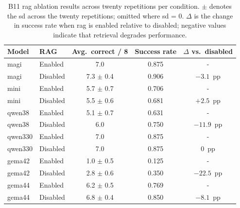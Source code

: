 \begin{table}[t]
	\centering
	\begin{tabular}{llccc}
		\hline
		\textbf{Model}        & \textbf{RAG}                    & \textbf{Avg.\ correct / 8} &
		\textbf{Success rate} & \textbf{$\Delta$ vs.\ disabled}                                                   \\
		\hline
		\gls{magi}            & Enabled                         & 7.0                        & 0.875 & -          \\
		\gls{magi}            & Disabled                        & 7.3 $\pm$ 0.4              & 0.906 & $-3.1$~pp  \\
		\hline
		\gls{mini}            & Enabled                         & 5.7 $\pm$ 0.7              & 0.706 & -          \\
		\gls{mini}            & Disabled                        & 5.5 $\pm$ 0.6              & 0.681 & $+2.5$~pp  \\
		\hline
		\gls{qwen38}          & Enabled                         & 5.1 $\pm$ 0.7              & 0.631 & -          \\
		\gls{qwen38}          & Disabled                        & 6.0                        & 0.750 & $-11.9$~pp \\
		\hline
		\gls{qwen330}         & Enabled                         & 7.0                        & 0.875 & -          \\
		\gls{qwen330}         & Disabled                        & 7.0                        & 0.875 & $0$~pp     \\
		\hline
		\gls{gema42}          & Enabled                         & 1.0 $\pm$ 0.5              & 0.125 & -          \\
		\gls{gema42}          & Disabled                        & 2.8 $\pm$ 0.6              & 0.350 & $-22.5$~pp \\
		\hline
		\gls{gema44}          & Enabled                         & 6.2 $\pm$ 0.5              & 0.769 & -          \\
		\gls{gema44}          & Disabled                        & 6.8 $\pm$ 0.4              & 0.850 & $-8.1$~pp  \\
		\hline
	\end{tabular}
	\caption{B11 \gls{rag} ablation results across twenty repetitions per condition. $\pm$ denotes the \gls{sd} across the twenty repetitions; omitted where \gls{sd} = 0. $\Delta$ is the change in success rate when \gls{rag} is enabled relative to disabled; negative values indicate that retrieval degrades performance.}
	\label{tab:b11-results}
\end{table}


